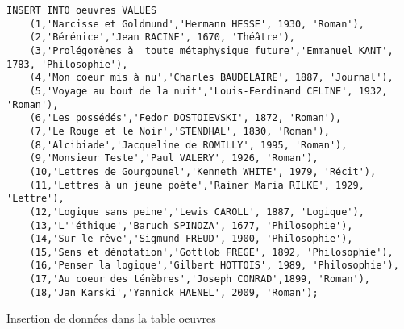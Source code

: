 \documentclass{article}
\begin{document}
\begin{listing}[H]
	\begin{verbatim}
INSERT INTO oeuvres VALUES
	(1,'Narcisse et Goldmund','Hermann HESSE', 1930, 'Roman'),
	(2,'Bérénice','Jean RACINE', 1670, 'Théâtre'),
	(3,'Prolégomènes à  toute métaphysique future','Emmanuel KANT', 1783, 'Philosophie'),
	(4,'Mon coeur mis à nu','Charles BAUDELAIRE', 1887, 'Journal'),
	(5,'Voyage au bout de la nuit','Louis-Ferdinand CELINE', 1932, 'Roman'),
	(6,'Les possédés','Fedor DOSTOIEVSKI', 1872, 'Roman'),
	(7,'Le Rouge et le Noir','STENDHAL', 1830, 'Roman'),
	(8,'Alcibiade','Jacqueline de ROMILLY', 1995, 'Roman'),
	(9,'Monsieur Teste','Paul VALERY', 1926, 'Roman'),
	(10,'Lettres de Gourgounel','Kenneth WHITE', 1979, 'Récit'),
	(11,'Lettres à un jeune poète','Rainer Maria RILKE', 1929, 'Lettre'),
	(12,'Logique sans peine','Lewis CAROLL', 1887, 'Logique'),
	(13,'L''éthique','Baruch SPINOZA', 1677, 'Philosophie'),
	(14,'Sur le rêve','Sigmund FREUD', 1900, 'Philosophie'),
	(15,'Sens et dénotation','Gottlob FREGE', 1892, 'Philosophie'),
	(16,'Penser la logique','Gilbert HOTTOIS', 1989, 'Philosophie'),
	(17,'Au coeur des ténèbres','Joseph CONRAD',1899, 'Roman'),
	(18,'Jan Karski','Yannick HAENEL', 2009, 'Roman');	
\end{verbatim}
	\caption{Insertion de données dans la table oeuvres}
\end{listing}
\end{document}
